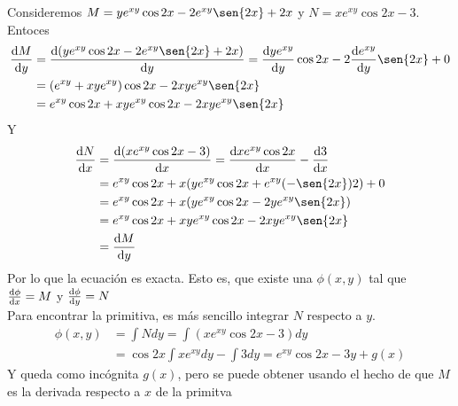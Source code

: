 \documentclass[14pt]{extarticle}
\begin{document}
\begin{enumerate}
{\begin{enumerate}
{                    \color{azul}
                    Consideremos $M = ye^{xy}\cos{2x}-2e^{xy}\sen{2x}+2x$ y $N = 
                    xe^{xy}\cos{2x}-3$. \\
                    Entoces
                    \begin{align*}
                        \dv{M}{y} 
                        &= \dv{(ye^{xy}\cos{2x}-2e^{xy}\sen{2x}+2x)}{y}
                        = \dv{ye^{xy}}{y}\cos{2x} - 2\dv{e^{xy}}{y}\sen{2x} + 0 \\
                        &= (e^{xy} + xye^{xy}) \cos{2x}- 2xye^{xy}\sen{2x} \\
                        &= e^{xy}\cos{2x} + xye^{xy}\cos{2x} - 2xye^{xy}\sen{2x}
                    \end{align*}
                    Y
                    \begin{align*}
                        \dv{N}{x} 
                        &= \dv{(xe^{xy}\cos{2x}-3)}{x} = \dv{xe^{xy}\cos{2x}}{x}
                        -\dv{3}{x} \\
                        &= e^{xy}\cos{2x} + x (ye^{xy}\cos{2x} 
                        + e^{xy}(-\sen{2x})2) + 0 \\
                        &= e^{xy}\cos{2x} + x(ye^{xy}\cos{2x} - 2ye^{xy}\sen{2x})\\
                        &= e^{xy}\cos{2x} + xye^{xy}\cos{2x} - 2xye^{xy}\sen{2x}\\
                        &= \dv{M}{y} 
                    \end{align*}
                    Por lo que la ecuación es exacta. Esto es, que existe una 
                    $\phi(x, y)$ tal que $\dv{\phi}{x} = M$ y $\dv{\phi}{y} = N$\\
                    Para encontrar la primitiva, es más sencillo integrar $N$
                    respecto a $y$.
                    \begin{align*}
                        \phi(x, y) &= \int{N dy}
                        = \int{(xe^{xy}\cos{2x}-3) dy} \\
                        &= \cos{2x} \int{xe^{xy} dy} - \int{3dy}
                        = e^{xy}\cos{2x} - 3y + g(x)
                    \end{align*}
                    Y queda como incógnita $g(x)$, pero se puede obtener usando 
                    el hecho de que $M$ es la derivada respecto a $x$ de la 
                    primitva
                    \begin{align*}

\end{align*}}
\end{enumerate}}
\end{enumerate}
\end{document}

